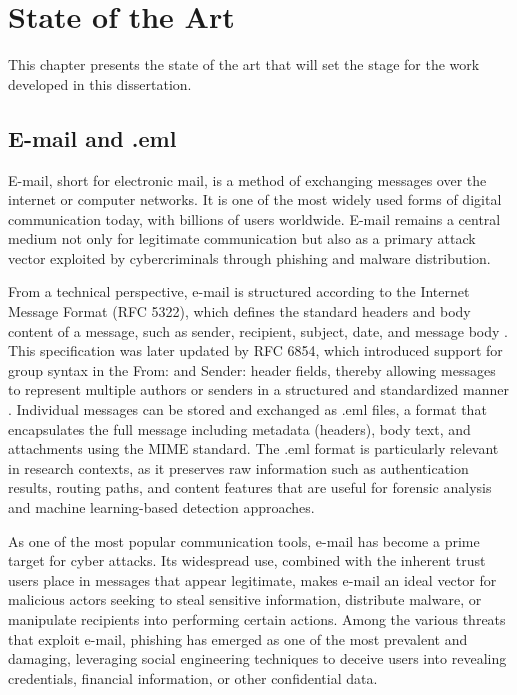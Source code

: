 \chapter{State of the Art}

This chapter presents the state of the art that will set the stage for the work developed in this dissertation.

\section{E-mail and .eml}

E-mail, short for electronic mail, is a method of exchanging messages over the internet or computer networks. It is one of the most widely used forms of digital communication today, with billions of users worldwide. E-mail remains a central medium not only for legitimate communication but also as a primary attack vector exploited by cybercriminals through phishing and malware distribution.

From a technical perspective, e-mail is structured according to the Internet Message Format (\acs{RFC} 5322), which defines the standard headers and body content of a message, such as sender, recipient, subject, date, and message body \cite{rfc5322}. This specification was later updated by \acs{RFC} 6854, which introduced support for group syntax in the From: and Sender: header fields, thereby allowing messages to represent multiple authors or senders in a structured and standardized manner \cite{rfc6854}. Individual messages can be stored and exchanged as .eml files, a format that encapsulates the full message including metadata (headers), body text, and attachments using the MIME standard. The .eml format is particularly relevant in research contexts, as it preserves raw information such as authentication results, routing paths, and content features that are useful for forensic analysis and machine learning-based detection approaches.

As one of the most popular communication tools, e-mail has become a prime target for cyber attacks. Its widespread use, combined with the inherent trust users place in messages that appear legitimate, makes e-mail an ideal vector for malicious actors seeking to steal sensitive information, distribute malware, or manipulate recipients into performing certain actions. Among the various threats that exploit e-mail, phishing has emerged as one of the most prevalent and damaging, leveraging social engineering techniques to deceive users into revealing credentials, financial information, or other confidential data.

